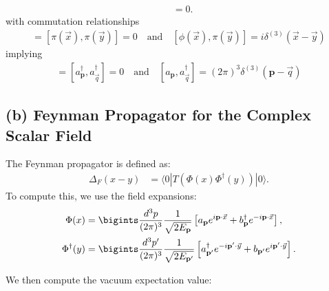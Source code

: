 {\begin{align*}
    &= 0.
\end{align*}
with commutation relationships
    \begin{align*}
        [\phi(\vec{x}), \phi(\vec{y})] = [\pi(\vec{x}), \pi(\vec{y})] = 0 \quad \text{and} \quad [\phi(\vec{x}), \pi(\vec{y})] = i\delta^{(3)}(\vec{x} - \vec{y})
    \end{align*}
    implying
    \begin{align*}
        [a_{\mathbf{p}}, a_{\vec{q}}] = [a^\dagger_{\mathbf{p}}, a^\dagger_{\vec{q}}] = 0 \quad \text{and} \quad [a_{\mathbf{p}}, a^\dagger_{\vec{q}}] = (2\pi)^3 \delta^{(3)}(\mathbf{p} - \vec{q})
    \end{align*}
\subsection*{(b) Feynman Propagator for the Complex Scalar Field}
The Feynman propagator is defined as:
\begin{align}
    \Delta_F(x - y) &= \langle 0 | T(\Phi(x) \Phi^\dagger(y)) | 0 \rangle.
\end{align}
To compute this, we use the field expansions:
\begin{align}
    \Phi(x) &= \bigints \frac{d^3p}{(2\pi)^3} \frac{1}{\sqrt{2E_{\mathbf{p}}}} \left[ a_{\mathbf{p}} e^{i \mathbf{p} \cdot \vec{x}} + b^\dagger_{\mathbf{p}} e^{-i \mathbf{p} \cdot \vec{x}} \right], \\
    \Phi^\dagger(y) &= \bigints \frac{d^3p^\prime}{(2\pi)^3} \frac{1}{\sqrt{2E_{\mathbf{p}^\prime}}} \left[ a^\dagger_{\mathbf{p}^\prime} e^{-i \mathbf{p}^\prime \cdot \vec{y}} + b_{\mathbf{p}^\prime} e^{i \mathbf{p}^\prime \cdot \vec{y}} \right].
\end{align}

We then compute the vacuum expectation value:

}

